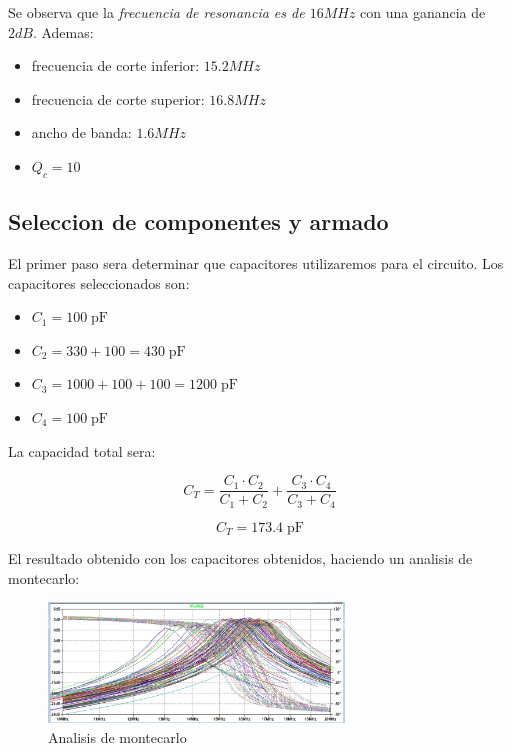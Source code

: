 Se observa que la \textit{frecuencia de resonancia es de $16 MHz$} con una ganancia de $2 dB$. Ademas:

\begin{itemize}
    \item frecuencia de corte inferior: $15.2 MHz$
    \item frecuencia de corte superior: $16.8 MHz$
    \item ancho de banda: $1.6 MHz$
    \item $Q_c = 10$
\end{itemize}

\newpage
\subsection{Seleccion de componentes y armado}

El primer paso sera determinar que capacitores utilizaremos para el circuito. Los capacitores seleccionados son:

\begin{itemize}
    \item $C_1 = 100\; \text{pF}$
    \item $C_2 = 330 + 100 = 430\; \text{pF}$
    \item $C_3 = 1000 + 100 + 100 =1200\; \text{pF}$
    \item $C_4 = 100\; \text{pF}$
\end{itemize}

La capacidad total sera:

\begin{equation}
    C_T = \frac{C_1 \cdot C_2}{C_1 + C_2} + \frac{C_3 \cdot C_4}{C_3 + C_4} 
\end{equation}


\begin{equation}
    \boxed{C_T = 173.4 \; \text{pF}}
\end{equation}

El resultado obtenido con los capacitores obtenidos, haciendo un analisis de montecarlo:

\begin{figure}[h]
    \centering
    \includegraphics[width=0.7\textwidth]{Imagenes/montecarlo.png}
    \caption{Analisis de montecarlo}
\end{figure}

